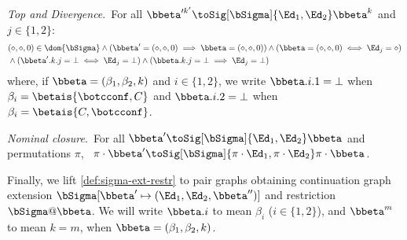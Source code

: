 \begin{definition}
\begin{compactitem}
  \item \emph{Top and Divergence}.~For all $\bbeta'^{k'}\toSig[\bSigma]{\Ed_1,\Ed_2}\bbeta^{k}$ and $j\in\{1,2\}$:
  \begin{align*}
    &    (\diamond,\diamond,0)\in\dom{\bSigma}\land (\bbeta'=(\diamond,\diamond,0)\implies\bbeta=(\diamond,\diamond,0)) \land
    (\bbeta=(\diamond,\diamond,0)\iff\Ed_j=\diamond) \\
&{}\land    (\bbeta'.k.j=\bot\iff \Ed_j=\bot) \land
(\bbeta.k.j=\bot\implies
    \Ed_j=\bot)
  \end{align*}
    where, if $\bbeta = (\beta_1,\beta_2, k)$ and $i \in\{1,2\}$, we write $\bbeta.i.1=\bot$ when $\beta_i=\betais{\botcconf,C}$ 
    and $\bbeta.i.2=\bot$ when $\beta_i=\betais{C,\botcconf}$.
  \item \emph{Nominal closure}.~For  all $\bbeta'\toSig[\bSigma]{\Ed_1,\Ed_2}\bbeta$ and permutations $\pi$, \
    $\pi\cdot\bbeta'\toSig[\bSigma]{\pi\cdot\Ed_1,\pi\cdot\Ed_2}\pi\cdot\bbeta$.
\end{compactitem}
%
Finally, we lift \cref{def:sigma-ext-restr} to pair graphs obtaining continuation graph extension
  $\bSigma[\bbeta'\mapsto(\Ed_1,\Ed_2,\bbeta'')]$
and restriction $\bSigma@\bbeta$.
We will write $\bbeta.i$ to mean $\beta_i$ ($i\in\{1,2\}$), and $\bbeta^m$ to mean $k=m$, when $\bbeta = (\beta_1,\beta_2,k)$.
\end{definition}


